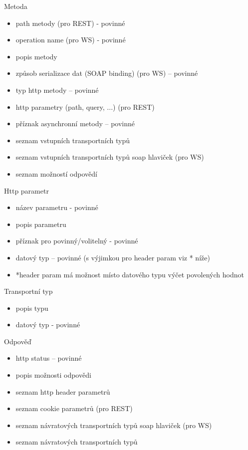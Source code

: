 \documentclass[11pt,twoside,a4paper]{book}
\begin{document}
Metoda

\begin{itemize}
  \item path metody (pro REST) - povinné
  \item operation name (pro WS) - povinné
  \item popis metody
  \item způsob serializace dat (SOAP binding) (pro WS) – povinné
  \item typ http metody – povinné
  \item http parametry (path, query, ...) (pro REST)
  \item příznak asynchronní metody – povinné
  \item seznam vstupních transportních typů
  \item seznam vstupních transportních typů soap hlaviček (pro WS)
  \item seznam možností odpovědí
\end{itemize}

Http parametr

\begin{itemize}
  \item název parametru - povinné
  \item popis parametru
  \item příznak pro povinný/volitelný - povinné
  \item datový typ – povinné (s výjimkou pro header param viz * níže)
  \item *header param má možnost místo datového typu výčet
povolených hodnot
\end{itemize}

Transportní typ

\begin{itemize}
  \item popis typu
  \item datový typ - povinné
\end{itemize}

Odpověď

\begin{itemize}
  \item http status – povinné
  \item popis možnosti odpovědi
  \item seznam http header parametrů
  \item seznam cookie parametrů (pro REST)
  \item seznam návratových transportních typů soap hlaviček (pro WS)
  \item seznam návratových transportních typů
\end{itemize}
\end{document}
